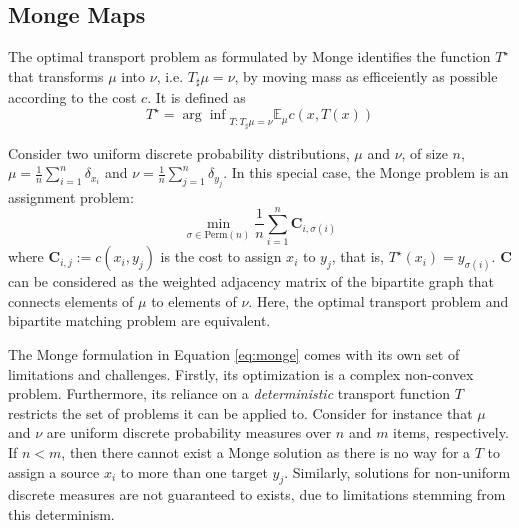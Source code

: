 \subsection{Monge Maps}
The optimal transport problem as formulated by Monge identifies the function
$T^\star$ that transforms $\mu$ into $\nu$, i.e. $T_\sharp \mu = \nu$,
by moving mass as efficeiently as possible according to the cost $c$.
It is defined as
\begin{equation}
  T^\star = {\arg \inf}_{T : T_\sharp \mu = \nu} \mathbb{E}_\mu c(x, T(x))
  \label{eq:monge}
\end{equation}

Consider two uniform discrete probability distributions, $\mu$ and $\nu$, of size $n$,
$\mu = \frac{1}{n} \sum_{i=1}^n \delta_{x_i}$
and $\nu = \frac{1}{n} \sum_{j=1}^n \delta_{y_j}$.
In this special case, the Monge problem is an assignment problem:
\begin{equation}
  \min_{\sigma \in \text{Perm}(n)} \frac{1}{n} \sum_{i=1}^{n} \mathbf{C}_{i,\sigma(i)}
\end{equation}
where $\mathbf{C}_{i,j} := c(x_i, y_j)$ is the cost to assign $x_i$ to $y_j$,
that is, $T^\star(x_i) = y_{\sigma(i)}$.
$\mathbf{C}$ can be considered as the weighted adjacency matrix of the bipartite graph that connects elements of $\mu$ to elements of $\nu$.
Here, the optimal transport problem and bipartite matching problem are equivalent.

The Monge formulation in Equation \ref{eq:monge} comes with its own set of limitations and challenges.
Firstly, its optimization is a complex non-convex problem.
Furthermore, its reliance on a \emph{deterministic} transport function $T$ restricts the set of problems it can be applied to.
Consider for instance that $\mu$ and $\nu$ are uniform discrete probability measures over $n$ and $m$ items, respectively.
If $n < m$, then there cannot exist a Monge solution as there is no way for a $T$ to assign a source $x_i$ to more than one target $y_j$.
Similarly, solutions for non-uniform discrete measures are not guaranteed to exists,
due to limitations stemming from this determinism.

